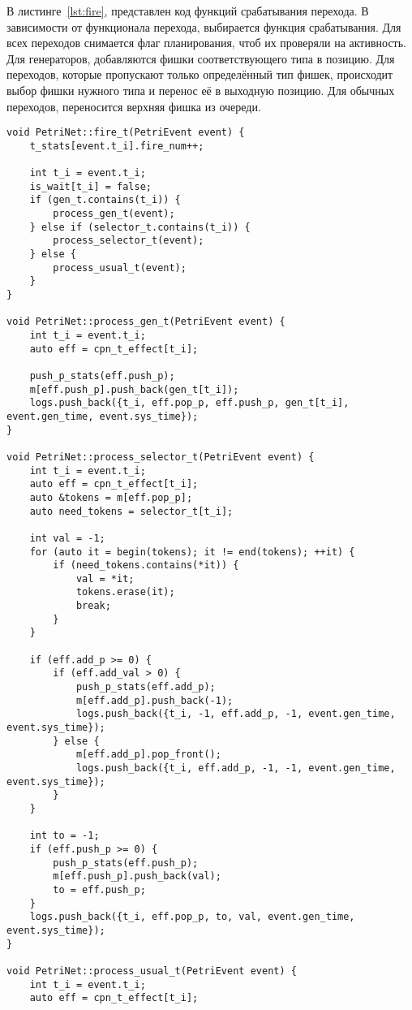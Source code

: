 В листинге~\ref{lst:fire}, представлен код функций срабатывания перехода. В зависимости от функционала перехода, выбирается функция срабатывания. Для всех переходов снимается флаг планирования, чтоб их проверяли на активность. Для генераторов, добавляются фишки соответствующего типа в позицию. Для переходов, которые пропускают только определённый тип фишек, происходит выбор фишки нужного типа и перенос её в выходную позицию. Для обычных переходов, переносится верхняя фишка из очереди.

\begin{center}
	\captionsetup{justification=raggedright,singlelinecheck=off}
	\begin{lstlisting}[label=lst:fire,caption=Функции срабатывания перехода ,showstringspaces=false]
void PetriNet::fire_t(PetriEvent event) {
	t_stats[event.t_i].fire_num++;
	
	int t_i = event.t_i;
	is_wait[t_i] = false;
	if (gen_t.contains(t_i)) {
		process_gen_t(event);
	} else if (selector_t.contains(t_i)) {
		process_selector_t(event);
	} else {
		process_usual_t(event);
	}
}

void PetriNet::process_gen_t(PetriEvent event) {
	int t_i = event.t_i;
	auto eff = cpn_t_effect[t_i];
	
	push_p_stats(eff.push_p);
	m[eff.push_p].push_back(gen_t[t_i]);
	logs.push_back({t_i, eff.pop_p, eff.push_p, gen_t[t_i], event.gen_time, event.sys_time});
}

void PetriNet::process_selector_t(PetriEvent event) {
	int t_i = event.t_i;
	auto eff = cpn_t_effect[t_i];
	auto &tokens = m[eff.pop_p];
	auto need_tokens = selector_t[t_i];
	
	int val = -1;
	for (auto it = begin(tokens); it != end(tokens); ++it) {
		if (need_tokens.contains(*it)) {
			val = *it;
			tokens.erase(it);
			break;
		}
	}
	
	if (eff.add_p >= 0) {
		if (eff.add_val > 0) {
			push_p_stats(eff.add_p);
			m[eff.add_p].push_back(-1);
			logs.push_back({t_i, -1, eff.add_p, -1, event.gen_time, event.sys_time});
		} else {
			m[eff.add_p].pop_front();
			logs.push_back({t_i, eff.add_p, -1, -1, event.gen_time, event.sys_time});
		}
	}
	
	int to = -1;
	if (eff.push_p >= 0) {
		push_p_stats(eff.push_p);
		m[eff.push_p].push_back(val);
		to = eff.push_p;
	}
	logs.push_back({t_i, eff.pop_p, to, val, event.gen_time, event.sys_time});
}

void PetriNet::process_usual_t(PetriEvent event) {
	int t_i = event.t_i;
	auto eff = cpn_t_effect[t_i];
	

\end{lstlisting}
\end{center}
